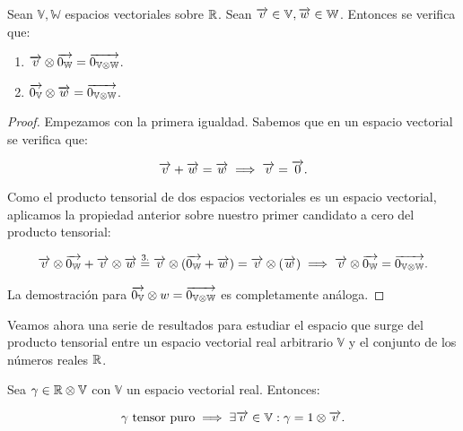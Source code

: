 \begin{proposicion} \label{prop:cero_tensorial_vector}
	Sean $\mathbb{V}, \mathbb{W}$ espacios vectoriales sobre $\mathbb{R}$. Sean $\overrightarrow{v} \in \mathbb{V}, \overrightarrow{w} \in \mathbb{W}$. Entonces se verifica que:

	\begin{enumerate}
		\item $\overrightarrow{v} \otimes \overrightarrow{0_\mathbb{W}} = \overrightarrow{0_{\mathbb{V} \otimes \mathbb{W}}}$.
		\item $\overrightarrow{0_{\mathbb{V}}} \otimes \overrightarrow{w} = \overrightarrow{0_{\mathbb{V} \otimes \mathbb{W}}}$.
	\end{enumerate}
\end{proposicion}
\begin{proof}
	Empezamos con la primera igualdad. Sabemos que en un espacio vectorial se verifica que:

	\begin{equation} \label{eq:dem_tensor_cero}
		\overrightarrow{v} + \overrightarrow{w} = \overrightarrow{w} \implies \overrightarrow{v} = \overrightarrow{0}.
	\end{equation}

    Como el producto tensorial de dos espacios vectoriales es un espacio vectorial, aplicamos la propiedad anterior sobre nuestro primer candidato a cero del producto tensorial:

    \begin{equation}
        \begin{split}
            \overrightarrow{v} \otimes \overrightarrow{0_\mathbb{W}} + \overrightarrow{v} \otimes \overrightarrow{w} \stackrel{\text{3.}}{=} \overrightarrow{v} \otimes (\overrightarrow{0_\mathbb{W}} + \overrightarrow{w}) = \overrightarrow{v} \otimes (\overrightarrow{w}) \implies \overrightarrow{v} \otimes \overrightarrow{0_\mathbb{W}} = \overrightarrow{0_{\mathbb{V} \otimes \mathbb{W}}}.
        \end{split}
    \end{equation}

    La demostración para $\overrightarrow{0_{\mathbb{V}}} \otimes w = \overrightarrow{0_{\mathbb{V} \otimes \mathbb{W}}}$ es completamente análoga.
\end{proof}

Veamos ahora una serie de resultados para estudiar el espacio que surge del producto tensorial entre un espacio vectorial real arbitrario $\mathbb{V}$ y el conjunto de los números reales $\mathbb{R}$.

\begin{proposicion}
    Sea $\gamma \in \mathbb{R} \otimes \mathbb{V}$ con $\mathbb{V}$ un espacio vectorial real. Entonces:

    \begin{equation}
        \gamma \text{ tensor puro} \implies \exists \overrightarrow{v} \in \mathbb{V}: \gamma = 1 \otimes \overrightarrow{v}.
    \end{equation}
\end{proposicion}

